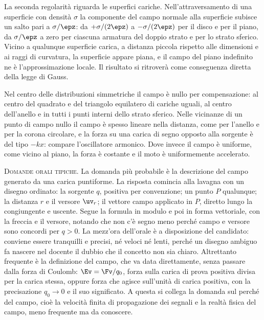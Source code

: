 \documentclass[main.tex]{subfiles}
\begin{document}
La seconda regolarità riguarda le superfici cariche. Nell'attraversamento di una superficie con densità $\sigma$ la componente del campo normale alla superficie subisce un salto pari a $\sigma/\epz$: da $+\sigma/(2\epz)$ a $-\sigma/(2\epz)$ per il disco e per il piano, da $\sigma/\epz$ a zero per ciascuna armatura del doppio strato e per lo strato sferico. Vicino a qualunque superficie carica, a distanza piccola rispetto alle dimensioni e ai raggi di curvatura, la superficie appare piana, e il campo del piano indefinito ne è l'approssimazione locale. Il risultato si ritroverà come conseguenza diretta della legge di Gauss.

Nel centro delle distribuzioni simmetriche il campo è nullo per compensazione: al centro del quadrato e del triangolo equilatero di cariche uguali, al centro dell'anello e in tutti i punti interni dello strato sferico. Nelle vicinanze di un punto di campo nullo il campo è spesso lineare nella distanza, come per l'anello e per la corona circolare, e la forza su una carica di segno opposto alla sorgente è del tipo $-kx$: compare l'oscillatore armonico. Dove invece il campo è uniforme, come vicino al piano, la forza è costante e il moto è uniformemente accelerato.

\medskip

\noindent\textsc{Domande orali tipiche.} La domanda più probabile è la descrizione del campo generato da una carica puntiforme. La risposta comincia alla lavagna con un disegno ordinato: la sorgente $q$, positiva per convenzione; un punto $P$ qualunque; la distanza $r$ e il versore $\uv_r$; il vettore campo applicato in $P$, diretto lungo la congiungente e uscente. Segue la formula in modulo e poi in forma vettoriale, con la freccia e il versore, notando che non c'è segno meno perché campo e versore sono concordi per $q>0$. La mezz'ora dell'orale è a disposizione del candidato: conviene essere tranquilli e precisi, né veloci né lenti, perché un disegno ambiguo fa nascere nel docente il dubbio che il concetto non sia chiaro. Altrettanto frequente è la definizione del campo, che va data direttamente, senza passare dalla forza di Coulomb: $\Ev=\Fv/q_0$, forza sulla carica di prova positiva divisa per la carica stessa, oppure forza che agisce sull'unità di carica positiva, con la precisazione $q_0\to0$ e il suo significato. A questa si collega la domanda sul perché del campo, cioè la velocità finita di propagazione dei segnali e la realtà fisica del campo, meno frequente ma da conoscere.
\end{document}
